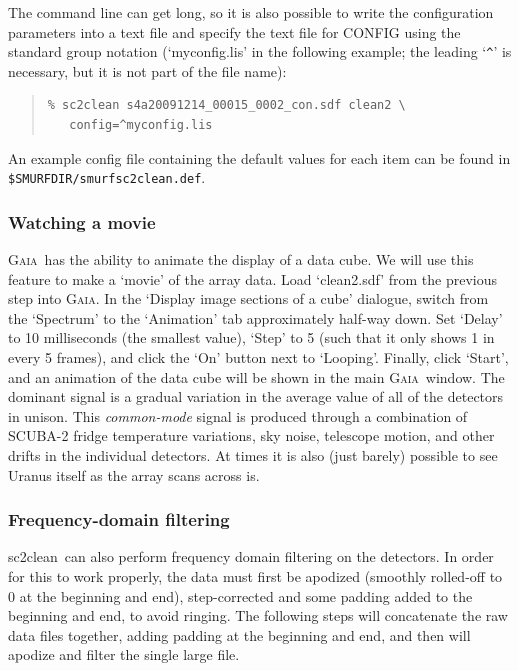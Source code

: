 \documentclass[twoside,11pt]{article}
\newcommand{\xref}[3]{#1}
\newcommand{\xlabel}[1]{}
\renewcommand{\_}{\texttt{\symbol{95}}}
\newenvironment{myquote}{\begin{quote}\begin{small}}{\end{small}\end{quote}}
\newcommand{\gaia}{\xref{\textsc{Gaia}}{sun214}{}}
\newcommand{\task}[1]{\textsf{#1}}
\newcommand{\clean}{\xref{\task{sc2clean}}{sun258}{SC2CLEAN}}
\begin{document}
The command line can get long, so it is also possible to write the
configuration parameters into a text file and specify the text file
for CONFIG using the standard group notation (`myconfig.lis' in the
following example; the leading `\verb|^|' is necessary, but it is not
part of the file name):

\begin{myquote}
\begin{verbatim}
% sc2clean s4a20091214_00015_0002_con.sdf clean2 \
   config=^myconfig.lis
\end{verbatim}
\end{myquote}

An example config file containing the default values for each item
can be found in \\ \texttt{\${SMURF\_DIR}/smurf\_sc2clean.def}.

\subsubsection{\xlabel{movie}Watching a movie}

\gaia\ has the ability to animate the display of a data cube. We will
use this feature to make a `movie' of the array data. Load
`clean2.sdf' from the previous step into \gaia. In the `Display image
sections of a cube' dialogue, switch from the `Spectrum' to the
`Animation' tab approximately half-way down.  Set `Delay' to 10
milliseconds (the smallest value), `Step' to 5 (such that it only
shows 1 in every 5 frames), and click the `On' button next to
`Looping'. Finally, click `Start', and an animation of the data cube
will be shown in the main \gaia\ window. The dominant signal is a
gradual variation in the average value of all of the detectors in
unison. This {\em common-mode} signal is produced through a
combination of SCUBA-2 fridge temperature variations, sky noise,
telescope motion, and other drifts in the individual detectors. At
times it is also (just barely) possible to see Uranus itself as the
array scans across is.

\subsubsection{\xlabel{fftfilter}Frequency-domain filtering}

\clean\ can also perform frequency domain filtering on the
detectors. In order for this to work properly, the data must first be
apodized (smoothly rolled-off to 0 at the beginning and end),
step-corrected and some padding added to the beginning and end, to
avoid ringing. The following steps will concatenate the raw data files
together, adding padding at the beginning and end, and then will
apodize and filter the single large file.
\end{document}
